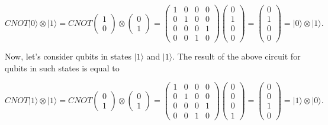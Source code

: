 \[ CNOT |0\rangle \otimes |1\rangle = CNOT \begin{pmatrix} 1 \\ 0 \end{pmatrix} \otimes \begin{pmatrix} 0 \\ 1 \end{pmatrix} = \begin{pmatrix} 1 & 0 & 0 & 0 \\ 0 & 1 & 0 & 0 \\ 0 & 0 & 0 & 1 \\ 0 & 0 & 1 & 0 \end{pmatrix} \begin{pmatrix} 0 \\ 1 \\ 0 \\ 0 \end{pmatrix} = \begin{pmatrix} 0 \\ 1 \\ 0 \\ 0\end{pmatrix} = |0\rangle \otimes |1\rangle.\]

Now, let's consider qubits in states $|1\rangle$ and $|1\rangle$. The result of the above circuit for qubits in such states is equal to

\[ CNOT |1\rangle \otimes |1\rangle = CNOT \begin{pmatrix} 0 \\ 1 \end{pmatrix} \otimes \begin{pmatrix} 0 \\ 1 \end{pmatrix} = \begin{pmatrix} 1 & 0 & 0 & 0 \\ 0 & 1 & 0 & 0 \\ 0 & 0 & 0 & 1 \\ 0 & 0 & 1 & 0 \end{pmatrix} \begin{pmatrix} 0 \\ 0 \\ 0 \\ 1 \end{pmatrix} = \begin{pmatrix} 0 \\ 0 \\ 1 \\ 0 \end{pmatrix} = |1\rangle \otimes |0\rangle.\]

